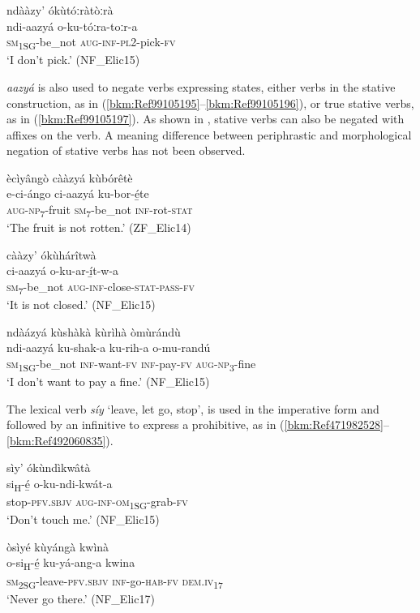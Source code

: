 \ea
\label{bkm:Ref99105170}
ndààzy’ ókùtóːràtòːrà\\
\gll ndi-aazyá  o-ku-tóːra-toːr-a\\
\textsc{sm}\textsubscript{1SG\-}-be\_not  \textsc{aug}-\textsc{inf}-\textsc{pl}2-pick-\textsc{fv}\\
\glt ‘I don’t pick.’ (NF\_Elic15)
\z

\textit{aazyá} is also used to negate verbs expressing states, either verbs in the stative construction, as in (\ref{bkm:Ref99105195}--\ref{bkm:Ref99105196}), or true stative verbs, as in (\ref{bkm:Ref99105197}). As shown in , stative verbs can also be negated with affixes on the verb. A meaning difference between periphrastic and morphological negation of stative verbs has not been observed.

\ea
\label{bkm:Ref99105195}
ècìyângò cààzyá kùbórêtè\\
\gll e-ci-ángo    ci-aazyá  ku-bor-é̲te\\
\textsc{aug}-\textsc{np}\textsubscript{7}-fruit  \textsc{sm}\textsubscript{7}-be\_not  \textsc{inf}-rot-\textsc{stat}\\
\glt ‘The fruit is not rotten.’ (ZF\_Elic14)
\z

\ea
\label{bkm:Ref99105196}
cààzy’ ókùhárîtwà\\
\gll ci-aazyá  o-ku-ar-í̲t-w-a\\
\textsc{sm}\textsubscript{7}-be\_not  \textsc{aug}-\textsc{inf}-close-\textsc{stat}-\textsc{pass}-\textsc{fv}\\
\glt ‘It is not closed.’ (NF\_Elic15)
\z

\ea
\label{bkm:Ref99105197}
ndàázyá kùshàkà kùrìhà òmùrándù\\
\gll ndi-aazyá  ku-shak-a  ku-rih-a  o-mu-randú\\
\textsc{sm}\textsubscript{1SG}-be\_not  \textsc{inf}-want-\textsc{fv}  \textsc{inf}-pay-\textsc{fv}  \textsc{aug}-\textsc{np}\textsubscript{3}-fine\\
\glt ‘I don’t want to pay a fine.’ (NF\_Elic15)
\z

The lexical verb \textit{síy} ‘leave, let go, stop’, is used in the imperative form and followed by an infinitive to express a prohibitive, as in (\ref{bkm:Ref471982528}--\ref{bkm:Ref492060835}).

\ea
\label{bkm:Ref471982528}
sìy’ ókùndìkwâtà\\
\gll si\textsubscript{H}-é̲      o-ku-ndi-kwát-a\\
stop-\textsc{pfv}.\textsc{sbjv}  \textsc{aug}-\textsc{inf}-\textsc{om}\textsubscript{1SG}-grab-\textsc{fv}\\
\glt ‘Don’t touch me.’ (NF\_Elic15)
\z

\ea
\label{bkm:Ref492060835}
òsìyé kùyángà kwìnà\\
\gll o-si\textsubscript{H}-é̲      ku-yá-ang-a    kwina\\
\textsc{sm}\textsubscript{2SG}-leave-\textsc{pfv}.\textsc{sbjv}  \textsc{inf}-go-\textsc{hab}-\textsc{fv}  \textsc{dem}.\textsc{iv}\textsubscript{17}\\
\glt ‘Never go there.’ (NF\_Elic17)
\z

